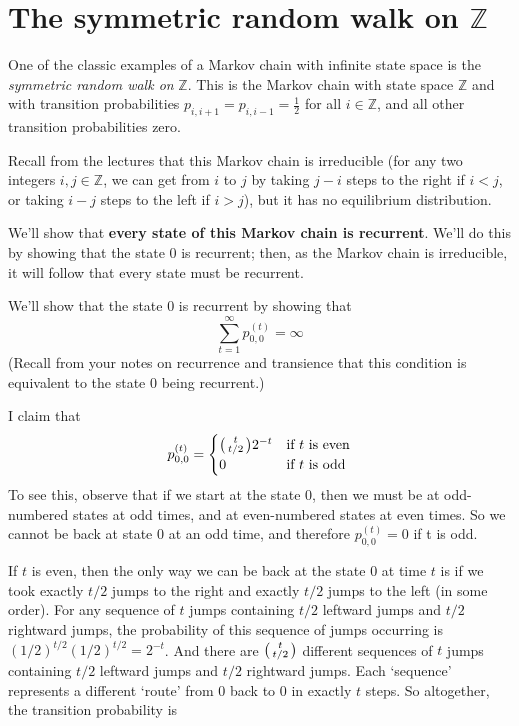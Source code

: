 \documentclass[11pt,a4paper]{article}
\newenvironment{psmallmatrix}
  {\left(\begin{smallmatrix}}
  {\end{smallmatrix}\right)}
\begin{document}
    \section*{The symmetric random walk on $\mathbb{Z}$}
    One of the classic examples of a Markov chain with infinite state space is the \textit{symmetric random walk on} $\mathbb{Z}$. This is the Markov chain with state space $\mathbb{Z}$ and with transition probabilities $p_{i,i+1} = p_{i,i−1} = \frac{1}{2}$ for all $i \in \mathbb{Z}$, and all other transition probabilities zero.\par
    Recall from the lectures that this Markov chain is irreducible (for any two integers $i, j \in \mathbb{Z}$, we can get from $i$ to $j$ by taking $j − i$ steps to the right if $i < j$, or taking $i − j$ steps to the left if $i > j$), but it has no equilibrium distribution.\par
    We’ll show that \textbf{every state of this Markov chain is recurrent}. We’ll do this by showing that the state $0$ is recurrent; then, as the Markov chain is irreducible, it will follow that every state must be recurrent.\par 
    We’ll show that the state 0 is recurrent by showing that
    $$\sum_{t = 1}^\infty p_{0,0}^{(t)} = \infty$$
    (Recall from your notes on recurrence and transience that this condition is equivalent to the state $0$ being recurrent.)\par 
    I claim that
    $$
    p_{0,0}^{(t)}
    =
    \begin{cases}
      \begin{psmallmatrix} t \\ t/2 \end{psmallmatrix}2^{-t} & \text{if}\ t \ \text{is even}\\
      0 & \text{if}\ t \ \text{is odd}
    \end{cases}
    $$
    To see this, observe that if we start at the state 0, then we must be at odd-numbered states at odd times, and at even-numbered states at even times. So we cannot be back at state $0$ at an odd time, and therefore $p_{0,0}^{(t)} = 0$ if t is odd.\par
    If $t$ is even, then the only way we can be back at the state $0$ at time $t$ is if we took exactly $t/2$ jumps to the right and exactly $t/2$ jumps to the left (in some order). For any sequence of $t$ jumps containing $t/2$ leftward jumps and $t/2$ rightward jumps, the probability of this sequence of jumps occurring is $(1/2)^{t/2}(1/2)^{t/2} = 2^{-t}$. And there are $\begin{psmallmatrix} t \\ t/2\end{psmallmatrix}$ different sequences of $t$ jumps containing $t/2$ leftward jumps and $t/2$ rightward jumps. Each ‘sequence’ represents a different ‘route’ from 0 back to $0$ in exactly $t$ steps. So altogether, the transition probability is
\end{document}
